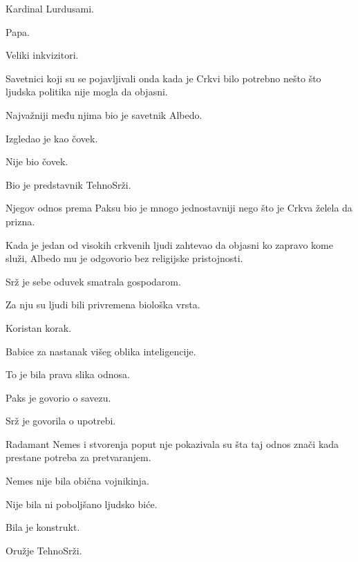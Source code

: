 \bigskip

Kardinal Lurdusami.

Papa.

Veliki inkvizitori.

Savetnici koji su se pojavljivali onda kada je Crkvi bilo potrebno nešto što ljudska politika nije mogla da objasni.

\bigskip

Najvažniji među njima bio je savetnik Albedo.

\bigskip

Izgledao je kao čovek.

Nije bio čovek.

\bigskip

Bio je predstavnik TehnoSrži.

\bigskip

Njegov odnos prema Paksu bio je mnogo jednostavniji nego što je Crkva želela da prizna.

\bigskip

Kada je jedan od visokih crkvenih ljudi zahtevao da objasni ko zapravo kome služi, Albedo mu je odgovorio bez religijske pristojnosti.

\bigskip

Srž je sebe oduvek smatrala gospodarom.

\bigskip

Za nju su ljudi bili privremena biološka vrsta.

Koristan korak.

\bigskip

Babice za nastanak višeg oblika inteligencije.

\bigskip

To je bila prava slika odnosa.

\bigskip

Paks je govorio o savezu.

Srž je govorila o upotrebi.

\bigskip

Radamant Nemes i stvorenja poput nje pokazivala su šta taj odnos znači kada prestane potreba za pretvaranjem.

\bigskip

Nemes nije bila obična vojnikinja.

Nije bila ni poboljšano ljudsko biće.

\bigskip

Bila je konstrukt.

\bigskip

Oružje TehnoSrži.

